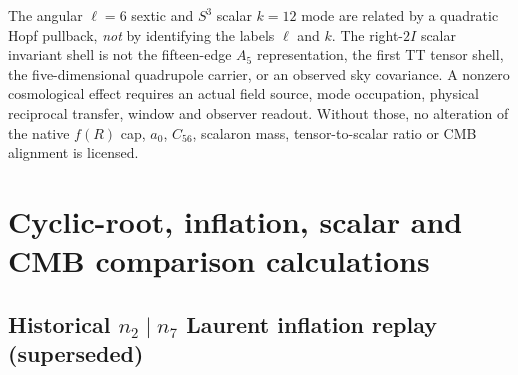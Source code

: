 \documentclass[12pt,a4paper]{article}
\begin{document}
\begin{remark}
The angular $\ell=6$ sextic and $S^3$ scalar $k=12$ mode are related
by a quadratic Hopf pullback, \emph{not} by identifying the labels
$\ell$ and $k$.  The right-$2I$ scalar invariant shell is not the
fifteen-edge $A_5$ representation, the first TT tensor shell, the
five-dimensional quadrupole carrier, or an observed sky covariance.
A nonzero cosmological effect requires an actual field source, mode
occupation, physical reciprocal transfer, window and observer readout.
Without those, no alteration of the native $f(R)$ cap, $a_0$, $C_{56}$,
scalaron mass, tensor-to-scalar ratio or CMB alignment is licensed.
\end{remark}


\section{Cyclic-root, inflation, scalar and CMB comparison calculations}
\label{p6c:sec:c2}
\subsection{Historical \(n_2\mid n_7\) Laurent inflation replay (superseded)}
\label{p8:sec:laur17-inflation}
\end{document}
